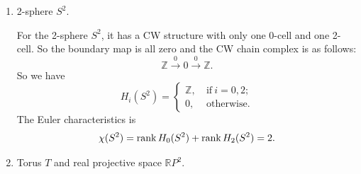 \documentclass[a4paper, 12pt]{article}
\begin{document}
\begin{solution}

\begin{enumerate}[(1)]
\item 2-sphere \(S^2\).

For the 2-sphere \(S^2\), it has a CW structure with only one 0-cell and one 2-cell. So the boundary map is all zero and the CW chain complex is as follows: 
\[\mathbb{Z}\xrightarrow{0} 0\xrightarrow{0} \mathbb{Z}.\]
So we have 
\[H_i(S^2)=\begin{cases}
    \mathbb{Z},&\ \text{if}\  i=0,2;\\ 
    0,&\ \text{otherwise}.
\end{cases}\]
The Euler characteristics is 
\[\chi(S^2)=\text{rank}\, H_0(S^2)+\text{rank}\, H_2(S^2)=2.\]
\item Torus \(T\) and real projective space \(\mathbb{R}P^2\). 


\end{enumerate}
\end{solution}
\end{document}
